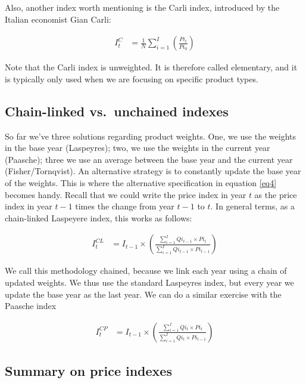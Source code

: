 \documentclass[
]{book}
\begin{document}
Also, another index worth mentioning is the Carli index, introduced by the Italian economist Gian Carli:

\begin{align}
   I_t^{C}&=\frac{1}{N}\sum^I_{i=1}\left(\frac{Pi_t}{Pi_0}\right)
    \label{eq13}
\end{align}

Note that the Carli index is unweighted. It is therefore called elementary, and it is typically only used when we are focusing on specific product types.

\hypertarget{chain-linked-vs.-unchained-indexes}{%
\subsection*{Chain-linked vs.~unchained indexes}\label{chain-linked-vs.-unchained-indexes}}

So far we've three solutions regarding product weights. One, we use the weights in the base year (Laspeyres); two, we use the weights in the current year (Paasche); three we use an average between the base year and the current year (Fisher/Tornqvist). An alternative strategy is to constantly update the base year of the weights. This is where the alternative specification in equation \eqref{eq4} becomes handy. Recall that we could write the price index in year \(t\) as the price index in year \(t-1\) times the change from year \(t-1\) to \(t\). In general terms, as a chain-linked Laspeyere index, this works as follows:

\begin{align}
   I_t^{CL}&=I_{t-1}\times  \left(\frac{\sum^I_{i=1} Qi_{t-1} \times Pi_t}{\sum^I_{i=1}Qi_{t-1} \times Pi_{t-1}}\right)
\end{align}

We call this methodology chained, because we link each year using a chain of updated weights. We thus use the standard Laspeyres index, but every year we update the base year as the last year. We can do a similar exercise with the Paasche index

\begin{align}
   I_t^{CP}&=I_{t-1}\times  \left(\frac{\sum^I_{i=1} Qi_{t} \times Pi_t}{\sum^I_{i=1}Qi_{t} \times Pi_{t-1}}\right)
\end{align}

\hypertarget{summary-on-price-indexes}{%
\subsection*{Summary on price indexes}\label{summary-on-price-indexes}}
\end{document}

